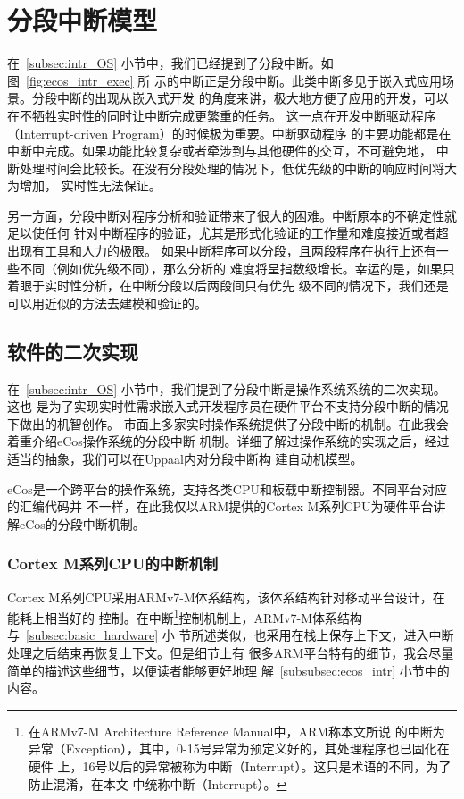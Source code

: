 \section{分段中断模型}
\label{sec:segment}

在~\ref{subsec:intr_OS} 小节中，我们已经提到了分段中断。如图~\ref{fig:ecos_intr_exec} 所
示的中断正是分段中断。此类中断多见于嵌入式应用场景。分段中断的出现从嵌入式开发
的角度来讲，极大地方便了应用的开发，可以在不牺牲实时性的同时让中断完成更繁重的任务。
这一点在开发中断驱动程序（Interrupt-driven Program）的时候极为重要。中断驱动程序
的主要功能都是在中断中完成。如果功能比较复杂或者牵涉到与其他硬件的交互，不可避免地，
中断处理时间会比较长。在没有分段处理的情况下，低优先级的中断的响应时间将大为增加，
实时性无法保证。

另一方面，分段中断对程序分析和验证带来了很大的困难。中断原本的不确定性就足以使任何
针对中断程序的验证，尤其是形式化验证的工作量和难度接近或者超出现有工具和人力的极限。
如果中断程序可以分段，且两段程序在执行上还有一些不同（例如优先级不同），那么分析的
难度将呈指数级增长。幸运的是，如果只着眼于实时性分析，在中断分段以后两段间只有优先
级不同的情况下，我们还是可以用近似的方法去建模和验证的。

\subsection{软件的二次实现}
\label{subsec:segment_software}

在~\ref{subsec:intr_OS} 小节中，我们提到了分段中断是操作系统系统的二次实现。这也
是为了实现实时性需求嵌入式开发程序员在硬件平台不支持分段中断的情况下做出的机智创作。
市面上多家实时操作系统提供了分段中断的机制。在此我会着重介绍eCos操作系统的分段中断
机制。详细了解过操作系统的实现之后，经过适当的抽象，我们可以在Uppaal内对分段中断构
建自动机模型。

eCos是一个跨平台的操作系统，支持各类CPU和板载中断控制器。不同平台对应的汇编代码并
不一样，在此我仅以ARM提供的Cortex M系列CPU为硬件平台讲解eCos的分段中断机制。

\subsubsection{Cortex M系列CPU的中断机制}
\label{subsubsec:cortex_m}

Cortex M系列CPU采用ARMv7-M体系结构，该体系结构针对移动平台设计，在能耗上相当好的
控制。在中断\footnote{在ARMv7-M Architecture Reference Manual中，ARM称本文所说
的中断为异常（Exception），其中，0-15号异常为预定义好的，其处理程序也已固化在硬件
上，16号以后的异常被称为中断（Interrupt）。这只是术语的不同，为了防止混淆，在本文
中统称中断（Interrupt）。}控制机制上，ARMv7-M体系结构与~\ref{subsec:basic_hardware} 小
节所述类似，也采用在栈上保存上下文，进入中断处理之后结束再恢复上下文。但是细节上有
很多ARM平台特有的细节，我会尽量简单的描述这些细节，以便读者能够更好地理
解~\ref{subsubsec:ecos_intr} 小节中的内容。

